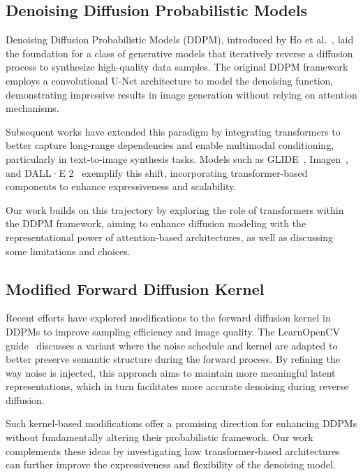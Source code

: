 \documentclass[twocolumn,superscriptaddress,aps]{revtex4-1}
\begin{document}
\subsection{Denoising Diffusion Probabilistic Models}

Denoising Diffusion Probabilistic Models (DDPM), introduced by Ho et al.~\cite{ho2020ddpm}, laid the foundation for a class of generative models that iteratively reverse a diffusion process to synthesize high-quality data samples. The original DDPM framework employs a convolutional U-Net architecture to model the denoising function, demonstrating impressive results in image generation without relying on attention mechanisms.

Subsequent works have extended this paradigm by integrating transformers to better capture long-range dependencies and enable multimodal conditioning, particularly in text-to-image synthesis tasks. Models such as GLIDE~\cite{nichol2021glide}, Imagen~\cite{saharia2022imagen}, and DALL·E 2~\cite{ramesh2022hierarchical} exemplify this shift, incorporating transformer-based components to enhance expressiveness and scalability.

Our work builds on this trajectory by exploring the role of transformers within the DDPM framework, aiming to enhance diffusion modeling with the representational power of attention-based architectures, as well as discussing some limitations and choices.

\subsection{Modified Forward Diffusion Kernel}
Recent efforts have explored modifications to the forward diffusion kernel in DDPMs to improve sampling efficiency and image quality. The LearnOpenCV guide~\cite{learnopencv2023ddpm} discusses a variant where the noise schedule and kernel are adapted to better preserve semantic structure during the forward process. By refining the way noise is injected, this approach aims to maintain more meaningful latent representations, which in turn facilitates more accurate denoising during reverse diffusion.

Such kernel-based modifications offer a promising direction for enhancing DDPMs without fundamentally altering their probabilistic framework. Our work complements these ideas by investigating how transformer-based architectures can further improve the expressiveness and flexibility of the denoising model.

\end{document}
